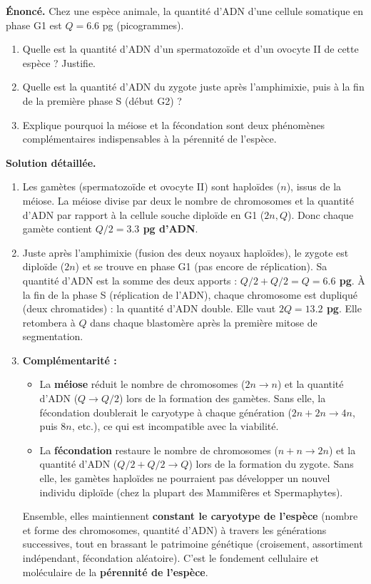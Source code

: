 \documentclass[11pt]{article}
\begin{document}
\begin{exoresolu}
\textbf{Énoncé.} Chez une espèce animale, la quantité d'ADN d'une cellule somatique en phase G1 est $Q = \num{6,6}$ pg (picogrammes). 
\begin{enumerate}
\item Quelle est la quantité d'ADN d'un spermatozoïde et d'un ovocyte II de cette espèce ? Justifie.
\item Quelle est la quantité d'ADN du zygote juste après l'amphimixie, puis à la fin de la première phase S (début G2) ?
\item Explique pourquoi la méiose et la fécondation sont deux phénomènes complémentaires indispensables à la pérennité de l'espèce.
\end{enumerate}
\tcblower
\textbf{Solution détaillée.}
\begin{enumerate}
\item Les gamètes (spermatozoïde et ovocyte II) sont haploïdes ($n$), issus de la méiose. La méiose divise par deux le nombre de chromosomes et la quantité d'ADN par rapport à la cellule souche diploïde en G1 ($2n, Q$). Donc chaque gamète contient \textbf{$Q/2 = \num{3,3}$ pg d'ADN}.
\item Juste après l'amphimixie (fusion des deux noyaux haploïdes), le zygote est diploïde ($2n$) et se trouve en phase G1 (pas encore de réplication). Sa quantité d'ADN est la somme des deux apports : \textbf{$Q/2 + Q/2 = Q = \num{6,6}$ pg}. À la fin de la phase S (réplication de l'ADN), chaque chromosome est dupliqué (deux chromatides) : la quantité d'ADN double. Elle vaut \textbf{$2Q = \num{13,2}$ pg}. Elle retombera à $Q$ dans chaque blastomère après la première mitose de segmentation.
\item \textbf{Complémentarité :} 
\begin{itemize}
\item La \textbf{méiose} réduit le nombre de chromosomes ($2n \to n$) et la quantité d'ADN ($Q \to Q/2$) lors de la formation des gamètes. Sans elle, la fécondation doublerait le caryotype à chaque génération ($2n + 2n \to 4n$, puis $8n$, etc.), ce qui est incompatible avec la viabilité.
\item La \textbf{fécondation} restaure le nombre de chromosomes ($n + n \to 2n$) et la quantité d'ADN ($Q/2 + Q/2 \to Q$) lors de la formation du zygote. Sans elle, les gamètes haploïdes ne pourraient pas développer un nouvel individu diploïde (chez la plupart des Mammifères et Spermaphytes).
\end{itemize}
Ensemble, elles maintiennent \textbf{constant le caryotype de l'espèce} (nombre et forme des chromosomes, quantité d'ADN) à travers les générations successives, tout en brassant le patrimoine génétique (croisement, assortiment indépendant, fécondation aléatoire). C'est le fondement cellulaire et moléculaire de la \textbf{pérennité de l'espèce}.
\end{enumerate}
\end{exoresolu}
\end{document}
